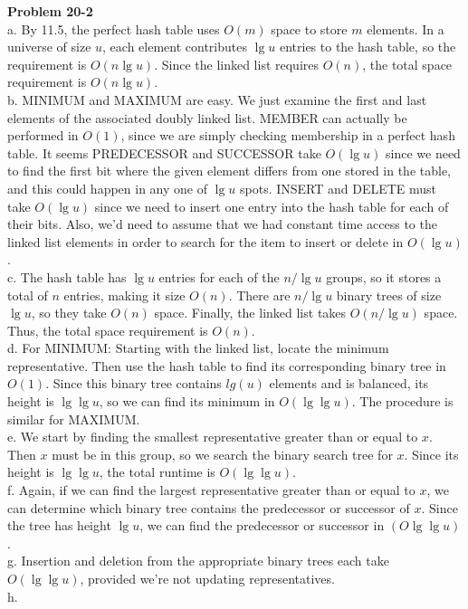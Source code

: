 \documentclass{article}
\begin{document}
\noindent\textbf{Problem 20-2}\\

a. By 11.5, the perfect hash table uses $O(m)$ space to store $m$ elements.  In a universe of size $u$, each element contributes $\lg u$ entries to the hash table, so the requirement is $O(n\lg u)$.  Since the linked list requires $O(n)$, the total space requirement is $O(n\lg u)$. \\

b. MINIMUM and MAXIMUM are easy.  We just examine the first and last elements of the associated doubly linked list. MEMBER can actually be performed in $O(1)$, since we are simply checking membership in a perfect hash table.  It seems PREDECESSOR and SUCCESSOR take $O(\lg u)$ since we need to find the first bit where the given element differs from one stored in the table, and this could happen in any one of $\lg u$ spots.  INSERT and DELETE must take $O(\lg u)$ since we need to insert one entry into the hash table for each of their bits.  Also, we'd need to assume that we had constant time access to the linked list elements in order to search for the item to insert or delete in $O(\lg u)$.  \\

c. The hash table has $\lg u$ entries for each of the $n/\lg u$ groups, so it stores a total of $n$ entries, making it size $O(n)$.  There are $n/\lg u$ binary trees of size $\lg u$, so they take $O(n)$ space.  Finally, the linked list takes $O(n/\lg u)$ space.  Thus, the total space requirement is $O(n)$. \\

d. For MINIMUM:  Starting with the linked list, locate the minimum representative.  Then use the hash table to find its corresponding binary tree in $O(1)$.  Since this binary tree contains $lg(u)$ elements and is balanced, its height is $\lg \lg u$, so we can find its minimum in $O(\lg \lg u)$.  The procedure is similar for MAXIMUM. \\

e. We start by finding the smallest representative greater than or equal to $x$. %
 Then $x$ must be in this group, so we search the binary search tree for $x$. Since its height is $\lg \lg u$, the total runtime is $O(\lg \lg u)$. \\

f. Again, if we can find the largest representative greater than or equal to $x$, we can determine which binary tree contains the predecessor or successor of $x$.  Since the tree has height $\lg u$, we can find the predecessor or successor in $(O\lg \lg u)$. \\

g. Insertion and deletion from the appropriate binary trees each take $O(\lg \lg u)$, provided we're not updating representatives. \\

h. %
\end{document}
